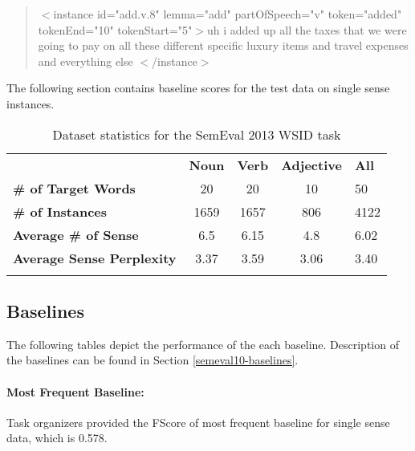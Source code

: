 \begin{quote}
 $<$instance id="add.v.8" 
 lemma="add" partOfSpeech="v" token="added" tokenEnd="10" tokenStart="5"$>$uh i added up all the taxes that we were going to pay on all these different specific luxury items and travel expenses and everything else
 $<$/instance$>$
\end{quote}

The following section contains baseline scores for the test data on single sense instances.

\begin{table}
\begin{center}
    \begin{tabular}{ l | c | c | c | l }  \Xhline{2\arrayrulewidth}  
     & \bf Noun & \bf Verb & \bf Adjective & \bf All \\  \Xhline{2\arrayrulewidth}  
    \bf \# of Target Words & 20 & 20 & 10 & 50 \\ 
    \bf \# of Instances & 1659 & 1657 & 806 & 4122 \\ 
    \bf Average \# of Sense & 6.5 & 6.15 & 4.8 & 6.02 \\ 
    \bf Average Sense Perplexity & 3.37 & 3.59 & 3.06 & 3.40 \\  \Xhline{2\arrayrulewidth}  
    \end{tabular}
\end{center}
    \caption{\label{table:semeval13-dataset} Dataset statistics for the SemEval 2013 WSID task}
\end{table}


\subsection{Baselines}

The following tables depict the performance of the each baseline. Description of the baselines can be found in Section \ref{semeval10-baselines}.


\paragraph{Most Frequent Baseline:} Task organizers provided the FScore of most frequent baseline for single sense data, which is 0.578.

